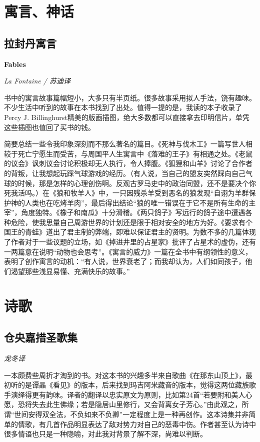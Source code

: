 \section{寓言、神话}

\subsection*{拉封丹寓言}
\par \textbf{Fables}
\par \emph{La Fontaine / 苏迪译} 
\par 书中的寓言故事篇幅短小，大多只有半页纸。很多故事采用拟人手法，饶有趣味。不少生活中听到的故事在本书找到了出处。值得一提的是，我读的本子收录了Percy J. Billinghurst精美的版画插图，绝大多数都可以直接拿去印明信片，单凭这些插图也值回了买书的钱。
\par 简要总结一些令我印象深刻而不那么著名的篇目。《死神与伐木工》一篇写世人相较于死亡宁愿生而受苦，与周国平人生寓言中《落难的王子》有相通之处。《老鼠的议会》讽刺议会讨论积极却无人执行，令人捧腹。《狐狸和山羊》讨论了合作者的背叛，让我想起玩踩气球游戏的经历。（有人说，当自己的盟友突然踩向自己气球的时候，那是怎样的心理创伤啊。反观古罗马史中的政治同盟，还不是要决个你死我活吗。）在《狼和牧羊人》中，一只因残杀羊受到恶名的狼发现“自诩为羊群保护神的人类也在吃烤羊肉”，最后得出结论“狼的唯一错误在于它不是所有生命的主宰”，角度独特。《橡子和南瓜》十分滑稽。《两只鸽子》写远行的鸽子途中遭遇各种危险，使我思量自己周游世界的计划还是限于相对安全的地方为好。《要求有个国王的青蛙》道出了君主制的弊端，即难以保证君主的贤明。为数不多的几篇体现了作者对于一些议题的立场，如《掉进井里的占星家》批评了占星术的虚伪，还有一两篇意在说明“动物也会思考”。《寓言的威力》一篇在全书中有纲领性的意义，表明了创作寓言的动机：“有人说，世界衰老了；而我却认为，人们如同孩子，他们渴望那些浅显易懂、充满快乐的故事。”

\par {}

\section{诗歌}

\subsection*{仓央嘉措圣歌集}
\par \emph{龙冬译} 
\par 一本颇费些周折才淘到的书。对这本书的兴趣多半来自歌曲《在那东山顶上》，最初听的是谭晶《看见》的版本，后来找到玛吉阿米藏音的版本，觉得这两位藏族歌手演绎得更有韵味。译者的翻译以忠实原文为原则，比如第24首“若要附和美人心愿，恐将失去此生佛缘；若是隐居山里修行，又会背离女子芳心。”由此观之，所谓“世间安得双全法，不负如来不负卿”一定程度上是一种再创作。这本诗集并非简单的情歌，有几首作品明显表达了敌对势力对自己的恶毒中伤。作者甚至认为诗中很多情语也只是一种隐喻，对此我对背景了解不深，尚难以判断。
\par {}

